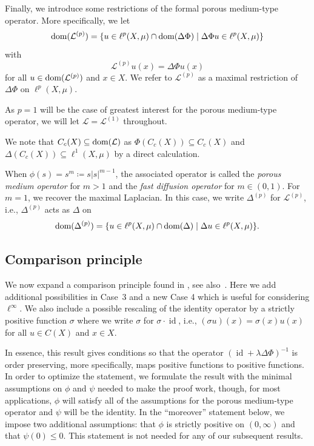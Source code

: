 \documentclass[letterpaper]{article}
\theoremstyle{definition}
\theoremstyle{named}
\numberwithin{equation}{section}
\newcommand{\dom}{\textnormal{dom}} %
\newcommand{\id}{\operatorname{id}}
\newcommand{\Deltaphi}{\mathcal{L}}
\newcommand{\Deltaphip}{\mathcal{L}^{(p)}}
\newcommand{\Dep}{\Delta^{(p)}}
\newcommand{\ellp}{\ell^p(X,\mu)}
\begin{document}
Finally, we introduce some restrictions of the formal porous medium-type operator. 
More specifically, we let 
$$\dom(\Deltaphip)= \{u \in \ellp \cap \dom (\Delta \Phi) \mid \Delta \Phi u \in \ellp\}$$ 
with
$$\Deltaphip u(x) = \Delta \Phi u(x)$$
for all $u \in \dom(\Deltaphip)$ and $x \in X$.
We refer to $\Deltaphip$ as a maximal restriction of $\Delta \Phi$ on $\ell^p(X,\mu)$.

As $p=1$ will be the case of greatest interest for the porous medium-type operator,
we will let $\Deltaphi=\Deltaphi^{(1)}$ throughout.

We note that $C_c(X) \subseteq \dom(\Deltaphi)$ 
as $\Phi(C_c(X)) \subseteq C_c(X)$ and
$\Delta(C_c(X)) \subseteq \ell^1(X,\mu)$ by a direct calculation.

When $\phi(s)=s^m\coloneqq s|s|^{m-1}$, the associated operator is called the \emph{porous medium operator} for $m>1$ and the \emph{fast diffusion operator} for $m\in (0,1)$. 
For $m=1$, we recover the maximal Laplacian. In this case, we write $\Dep$ for $\Deltaphip$, i.e.,
$\Dep$ acts as $\Delta$ on
$$\dom(\Dep)=\{ u \in \ell^p(X,\mu) \cap \dom(\Delta) \mid \Delta u \in \ell^p(X,\mu) \}. $$




\subsection{Comparison principle}
We now expand a comparison principle found in \cite[Theorem~A.2]{bianchi2022generalized}, see also~\cite[Lemma~3.5~and~Corollary~3.6]{schmidt2025nonlinear}. 
Here we add additional possibilities in Case~3 
and a new Case 4 which is useful for considering $\ell^\infty$.
We also include a possible rescaling of the identity operator by a strictly
positive function $\sigma$ where we write $\sigma$ for $\sigma \cdot \id$, i.e.,
$(\sigma u)(x)=\sigma(x)u(x)$ for all $u \in C(X)$ and $x \in X$.

In essence, this result gives conditions so that the operator $(\id + \lambda\Delta \Phi)^{-1}$
is  order preserving, more specifically, maps positive functions to positive functions.
In order to optimize the statement, 
we formulate the result with the minimal assumptions on $\phi$
and $\psi$ needed to make the proof work, though, for most applications, 
$\phi$ will satisfy all of the assumptions
for the porous medium-type operator and $\psi$ will be the identity.
 In the ``moreover'' statement below, we impose two
additional assumptions: that $\phi$ is strictly positive on $(0,\infty)$
and that $\psi(0)\leq0$. This statement is not needed for any of our
subsequent results.
\end{document}
